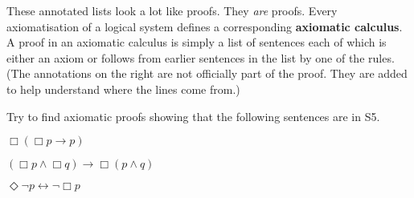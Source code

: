 These annotated lists look a lot like proofs. They \emph{are} proofs. Every
axiomatisation of a logical system defines a corresponding \textbf{axiomatic
  calculus}. A proof in an axiomatic calculus is simply a list of sentences each
of which is either an axiom or follows from earlier sentences in the list by one
of the rules. (The annotations on the right are not officially part of the proof.
They are added to help understand where the lines come from.)

\begin{exercise}
  Try to find axiomatic proofs showing that the following sentences are in S5.
  \begin{exlist}
    \item $\Box(\Box p \to p)$
    \item $(\Box p \land \Box q) \to \Box(p \land q)$
    \item $\Diamond \neg p \leftrightarrow \neg \Box p$
  \end{exlist}
\end{exercise}
